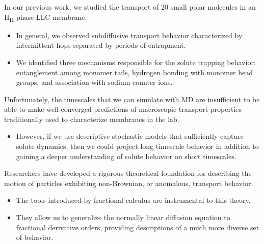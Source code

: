 \documentclass{article}
\begin{document}
  \noindent In our previous work, we studied the transport of 20 small polar molecules
  in an H\textsubscript{II} phase LLC membrane.
  \begin{itemize}
    \item In general, we observed subdiffusive transport behavior characterized by 
    intermittent hops separated by periods of entrapment.
    \item We identified three mechanisms responsible for the solute trapping behavior:
    entanglement among monomer tails, hydrogen bonding with monomer head groups, and
    association with sodium counter ions.
  \end{itemize}

  Unfortunately, the timescales that we can simulate with MD are insufficient to be
  able to make well-converged predictions of macroscopic transport properties 
  traditionally used to characterize membranes in the lab.
  \begin{itemize}
    \item However, if we use descriptive stochastic models that sufficiently capture solute
    dynamics, then we could project long timescale behavior in addition to gaining
    a deeper understanding of solute behavior on short timescales.
  \end{itemize}
  
  \noindent Researchers have developed a rigorous theoretical foundation for describing
  the motion of particles exhibiting non-Brownian, or anomalous, transport behavior.
  \begin{itemize}
    \item The tools introduced by fractional calculus are instrumental to this theory. 
    \item They allow us to generalize the normally linear diffusion equation to fractional
    derivative orders, providing descriptions of a much more diverse set of behavior. \cite{klages_anomalous_2008} %
  \end{itemize}
  
\end{document}
